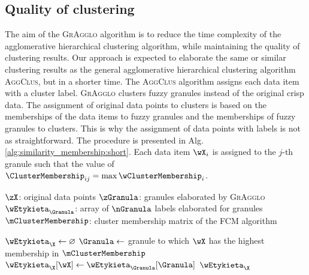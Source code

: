 \documentclass{amcs}
\newcommand{\procedura}[1]{\textsc{#1}}
\newcommand{\abbrAgglomerativeClustering}{\procedura{AggClus}}
\newcommand{\MojAlg}{\procedura{GrAgglo}}
\newcommand{\efn}{extensional fuzzy number}
\begin{document}
 
\subsection{Quality of clustering} 

The aim of the \MojAlg{} algorithm is to reduce the time complexity of the agglomerative hierarchical clustering algorithm, while maintaining the quality of clustering results.
Our approach is expected to elaborate the same or similar clustering results as the general agglomerative hierarchical clustering algorithm \abbrAgglomerativeClustering, but in a shorter time.
The \abbrAgglomerativeClustering{} algorithm assigns each data item with a cluster label.
\MojAlg{} clusters fuzzy granules instead of the original crisp data. 
The assignment of original data points to clusters is based on the memberships of the data items to fuzzy granules and the memberships of fuzzy granules to clusters.
This is why the assignment of data points with labels is not as straightforward.
The procedure is presented in Alg. \ref{alg:similarity_membership:short}.
Each data item $\wX_i$ is assigned to the $j$-th granule such that the value of $\ClusterMembership_{ij} = \max{\wClusterMembership_i}$. 

\begin{algorithm}[]
\caption{Elaboration of the labels of the data items}
\label{alg:similarity_membership:short}
\begin{algorithmic}[1]
	\REQUIRE $\zX$: original data points 
	\REQUIRE $\zGranula$: granules elaborated by \MojAlg{}
	\REQUIRE $\wEtykieta_{\Granula}$: array of $\nGranula$ labels elaborated for granules
	\REQUIRE $\mClusterMembership$: cluster membership matrix of the FCM algorithm 

	\STATE $\wEtykieta_{\X} \gets \varnothing$ 
	\STATE $\Granula \gets$ granule to which $\wX$ has the highest membership in $\mClusterMembership$
	\STATE $\wEtykieta_{\X}[\wX] \gets \wEtykieta_{\Granula}[\Granula]$ 
	\ENDFOR
	\RETURN $\wEtykieta_{\X}$ 
\end{algorithmic}
\end{algorithm}

 
\end{document}
